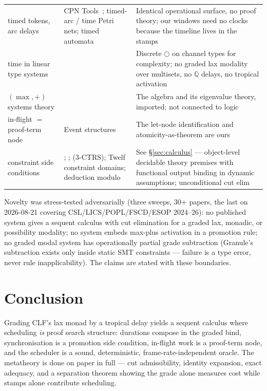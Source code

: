 \documentclass[11pt]{article}
\newcommand{\QQ}{\mathbb{Q}}                     %
\theoremstyle{definition}
\theoremstyle{remark}
\begin{document}
\begin{center}
\begin{longtable}{p{3.1cm}p{5.5cm}p{5.5cm}}
timed tokens, arc delays
&
CPN Tools~\cite{Jensen2007CPN}; timed-arc / time Petri nets; timed automata
&
Identical operational surface, no proof theory; our windows need no clocks
because the timeline lives in the stamps
\\

time in linear type systems
&
\cite{DasHoffmannPfenning2018}
&
Discrete $\bigcirc$ on channel types for complexity; no graded lax modality over
multisets, no $\QQ$ delays, no tropical activation
\\

$({\max},{+})$ systems theory
&
\cite{Baccelli1992}
&
The algebra and its eigenvalue theory, imported; not connected to logic
\\

in-flight $=$ proof-term node
&
Event structures~\cite{NielsenPlotkinWinskel1981}
&
The let-node identification and atomicity-as-theorem are ours
\\

constraint side conditions
&
\cite{LassezMcAloon1990}; \cite{NegriVonPlato1998};
\cite{Ohlebusch2002} (3-CTRS); Twelf constraint domains; deduction modulo
&
See \S\ref{sec:calculus} --- object-level decidable theory premises with
functional output binding in dynamic assumptions; unconditional cut elim
\\

\end{longtable}
\end{center}

\noindent Novelty was stress-tested adversarially (three sweeps, 30+ papers,
the last on 2026-08-21 covering CSL/LICS/POPL/FSCD/ESOP 2024--26): no published
system gives a sequent calculus with cut elimination for a graded lax, monadic,
or possibility modality; no system embeds max-plus activation in a promotion
rule; no graded modal system has operationally partial grade subtraction
(Granule's subtraction exists only inside static SMT constraints --- failure is a
type error, never rule inapplicability).  The claims are stated with these
boundaries.

\section{Conclusion}
\label{sec:conclusion}

Grading CLF's lax monad by a tropical delay yields a sequent calculus where
scheduling \emph{is} proof search structure: durations compose in the graded
bind, synchronisation is a promotion side condition, in-flight work is a
proof-term node, and the scheduler is a sound, deterministic,
frame-rate-independent oracle.  The metatheory is done on paper in full --- cut
admissibility, identity expansion, exact adequacy, and a separation theorem
showing the grade alone measures cost while stamps alone contribute scheduling.
\end{document}

